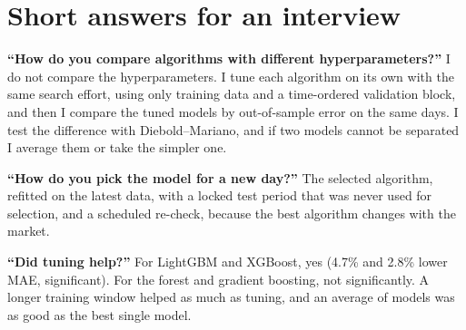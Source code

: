 \documentclass[11pt,a4paper]{article}
\begin{document}
\section{Short answers for an interview}

\textbf{``How do you compare algorithms with different hyperparameters?''} I do not compare the hyperparameters. I tune each
algorithm on its own with the same search effort, using only training data and a time-ordered validation block, and then I
compare the tuned models by out-of-sample error on the same days. I test the difference with Diebold--Mariano, and if two
models cannot be separated I average them or take the simpler one.

\textbf{``How do you pick the model for a new day?''} The selected algorithm, refitted on the latest data, with a locked
test period that was never used for selection, and a scheduled re-check, because the best algorithm changes with the
market.

\textbf{``Did tuning help?''} For LightGBM and XGBoost, yes (4.7\% and 2.8\% lower MAE, significant). For the forest and
gradient boosting, not significantly. A longer training window helped as much as tuning, and an average of models was as
good as the best single model.
\end{document}
